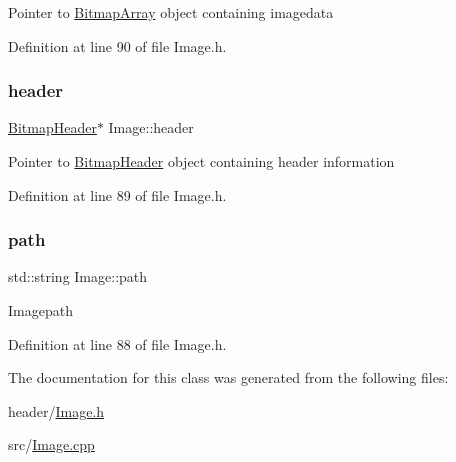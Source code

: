 Pointer to \mbox{\hyperlink{classBitmapArray}{Bitmap\+Array}} object containing imagedata 

Definition at line 90 of file Image.\+h.

\mbox{\label{classImage_adaf72c2df8979eafb4031dc0384dc49f}} 
\subsubsection{\texorpdfstring{header}{header}}
{\footnotesize\ttfamily \mbox{\hyperlink{classBitmapHeader}{Bitmap\+Header}}$\ast$ Image\+::header\hspace{0.3cm}{\ttfamily [private]}}

Pointer to \mbox{\hyperlink{classBitmapHeader}{Bitmap\+Header}} object containing header information 

Definition at line 89 of file Image.\+h.

\mbox{\label{classImage_aec8a33f176362d146da8c058798ebbff}} 
\subsubsection{\texorpdfstring{path}{path}}
{\footnotesize\ttfamily std\+::string Image\+::path\hspace{0.3cm}{\ttfamily [private]}}

Imagepath 

Definition at line 88 of file Image.\+h.



The documentation for this class was generated from the following files\+:\begin{DoxyCompactItemize}
\item 
header/\mbox{\hyperlink{Image_8h}{Image.\+h}}\item 
src/\mbox{\hyperlink{Image_8cpp}{Image.\+cpp}}\end{DoxyCompactItemize}

